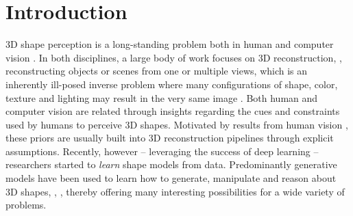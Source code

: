 \section{Introduction}
\label{sec:introduction}



3D shape perception is a long-standing problem both in human \cite{Pizlo2007CAIP,Pizlo2010} and computer vision \cite{Furukawa2013FTCGV}. In both disciplines, a large body of work focuses on 3D reconstruction, \eg, reconstructing objects or scenes from one or multiple views, which is an inherently ill-posed inverse problem where many configurations of shape, color, texture and lighting may result in the very same image \cite{Furukawa2013FTCGV}.
Both human and computer vision are related through insights regarding the cues and constraints used by humans to perceive 3D shapes. Motivated by results from human vision \cite{Pizlo2007CAIP,Pizlo2010}, these priors are usually built into 3D reconstruction pipelines through explicit assumptions. Recently, however -- leveraging the success of deep learning -- researchers started to \emph{learn} shape models from data. Predominantly generative models have been used to learn how to generate, manipulate and reason about 3D shapes, \eg, \cite{Girdhar2016ECCV,Brock2016ARXIV,Sharma2016ARXIV,WuNIPS2016,Wu2015CVPR}, thereby offering many interesting possibilities for a wide variety of problems.

